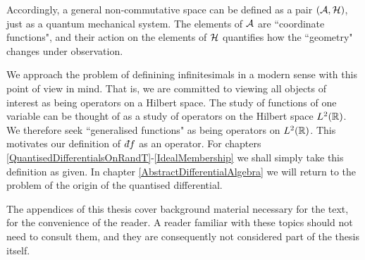 Accordingly, a general non-commutative space can be defined
as a pair $(\mathcal{A},\mathcal{H})$, just as a quantum mechanical system.
The elements of $\mathcal{A}$ are ``coordinate functions", and their
action on the elements of $\mathcal{H}$ quantifies how the ``geometry"
changes under observation.

We approach the problem of definining
infinitesimals in a modern sense with this point of view in mind.
That is, we are committed to viewing all objects of interest as being operators
on a Hilbert space. The study of functions of one variable can be thought
of as a study of operators on the Hilbert space $L^2(\mathbb{R})$. We therefore
seek ``generalised functions" as being operators on $L^2(\mathbb{R})$. This motivates
our definition of $\qd f$ as an operator. For chapters \ref{QuantisedDifferentialsOnRandT}-\ref{IdealMembership} we shall simply take this definition as given. In chapter \ref{AbstractDifferentialAlgebra}
we will return to the problem of the origin of the quantised differential.

The appendices of this thesis cover background material necessary for the text,
for the convenience of the reader. A reader familiar with these topics
should not need to consult them, and they are consequently not considered
part of the thesis itself.


